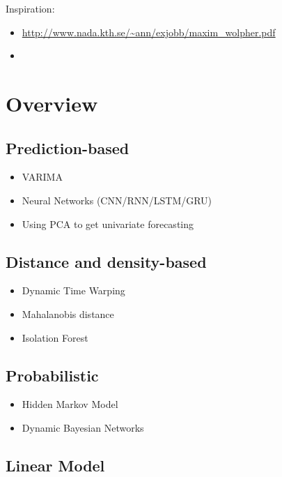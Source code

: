 Inspiration:
\begin{itemize}
    \item \url{http://www.nada.kth.se/~ann/exjobb/maxim_wolpher.pdf}
    \item \cite{Aggarwal2013a}
\end{itemize}

\section*{Overview}

\subsection{Prediction-based}

\begin{itemize}
    \item VARIMA \cite{Aggarwal2013a}
    \item Neural Networks (CNN/RNN/LSTM/GRU)
    \item Using PCA to get univariate forecasting \cite{Aggarwal2013a}

\end{itemize}

\subsection{Distance and density-based}
\begin{itemize}
  
    \item Dynamic Time Warping \cite{Aggarwal2013a}
    \item Mahalanobis distance \cite{Aggarwal2013a}
    \item Isolation Forest \cite{Liu2008}
\end{itemize}

\subsection{Probabilistic}

\begin{itemize}
    \item Hidden Markov Model \cite{Aggarwal2013a}
    \item Dynamic Bayesian Networks

\end{itemize}
\subsection{Linear Model}

